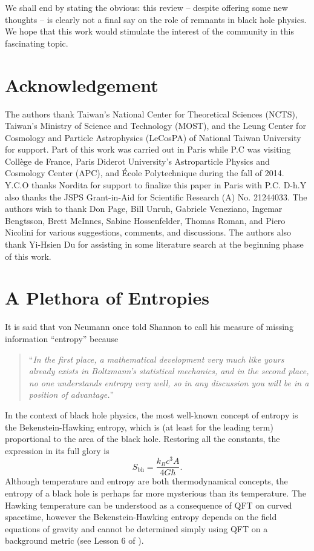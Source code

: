 \documentclass[12pt]{article}
\newcommand{\2}{$^2$}
\newcommand{\3}{$^3$}
\newcommand{\4}{$_4$}
\newcommand{\5}{$_5$}
\begin{document}
We shall end by stating the obvious: this review -- despite offering some new thoughts -- is clearly not a final say on the role of remnants in black hole physics. We hope that this work would stimulate the interest of the community in this fascinating topic. 





\section*{Acknowledgement}
The authors thank Taiwan's National Center for Theoretical Sciences (NCTS), Taiwan's Ministry of Science and Technology (MOST), and the Leung Center for Cosmology and Particle Astrophysics (LeCosPA) of National Taiwan University for support. Part of this work was carried out in Paris while P.C was visiting Coll\`ege de France, Paris Diderot University's Astroparticle Physics and Cosmology Center (APC), and \'Ecole Polytechnique during the fall of 2014. Y.C.O thanks Nordita for support to finalize this paper in Paris with P.C. D-h.Y also thanks the JSPS Grant-in-Aid for Scientific Research (A) No. 21244033. The authors wish to thank Don Page, Bill Unruh, Gabriele Veneziano, Ingemar Bengtsson, Brett McInnes, Sabine Hossenfelder, Thomas Roman, and Piero Nicolini for various suggestions, comments, and discussions. The authors also thank Yi-Hsien Du for assisting in some literature search at the beginning phase of this work. 

\appendix

\section{A Plethora of Entropies}\label{A}

It is said that von Neumann once told Shannon to call his measure of missing information ``entropy'' because \cite{avery}
\begin{quote}``\emph{In the first place, a mathematical development very much like yours already exists in Boltzmann's statistical mechanics, and in the second place, no one understands entropy very well, so in any discussion you will be in a position of advantage.}''
\end{quote}


In the context of black hole physics, the most well-known concept of entropy is the Bekenstein-Hawking entropy, which is (at least for the leading term) proportional to the area of the black hole. Restoring all the constants, the expression in its full glory is
\begin{equation}
S_{\text{bh}}=\frac{k_B c^3A}{4G\hbar}.
\end{equation}
Although temperature and entropy are both thermodynamical concepts, the entropy of a black hole is perhaps far more mysterious than its temperature. The Hawking temperature can be understood as a consequence of QFT on curved spacetime, however the Bekenstein-Hawking entropy depends on the field equations of gravity and cannot be determined simply using QFT on a background metric (see Lesson 6 of \cite{Pad}).
\end{document}
